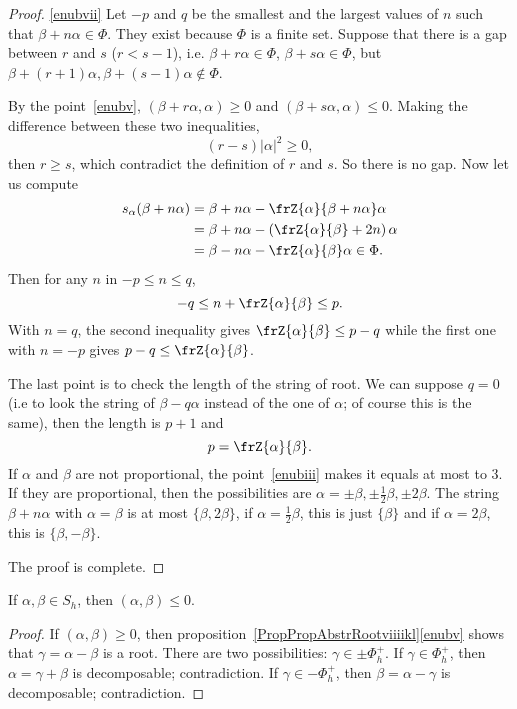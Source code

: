 \begin{proof}
	\ref{enubvii} Let $-p$ and $q$ be the smallest and the largest values of $n$ such that $\beta+n\alpha \in\Phi$. They exist because $\Phi$ is a finite set. Suppose that there is a gap between $r$ and $s$ ($r<s-1$), i.e. $\beta+r\alpha\in\Phi$, $\beta+s\alpha\in\Phi$, but $\beta+(r+1)\alpha,\beta+(s-1)\alpha\notin\Phi$.

	By the point~\ref{enubv}, $(\beta+r\alpha,\alpha)\geq 0$ and $(\beta+s\alpha,\alpha)\leq 0$. Making the difference between these two inequalities,
	\[
		(r-s)|\alpha|^2\geq 0,
	\]
	then $r\geq s$, which contradict the definition of $r$ and $s$. So there is no gap. Now let us compute
	\begin{equation}
		\begin{split}
			s_{\alpha}(\beta+n\alpha)&=\beta+n\alpha-\frZ{\alpha}{\beta+n\alpha}\alpha\\
			&=\beta+n\alpha-\left(    \frZ{\alpha}{\beta}+2n    \right)\alpha\\
			&=\beta-n\alpha-\frZ{\alpha}{\beta}\alpha\in\Phi.
		\end{split}
	\end{equation}
	Then for any $n$ in $-p\leq n\leq q$,
	\[
		-q\leq n+\frZ{\alpha}{\beta}\leq p.
	\]
	With $n=q$, the second inequality gives $\frZ{\alpha}{\beta}\leq p-q$ while the first one with $n=-p$ gives  $p-q\leq\frZ{\alpha}{\beta}$.

	The last point is to check the length of the string of root. We can suppose $q=0$ (i.e to look the string of $\beta-q\alpha$ instead of the one of $\alpha$; of course this is the same), then the length is $p+1$ and
	\[
		p=\frZ{\alpha}{\beta}.
	\]
	If $\alpha$ and $\beta$ are not proportional, the point~\ref{enubiii} makes it equals at most to $3$. If they are proportional, then the possibilities are $\alpha=\pm\beta,\pm\frac{1}{2}\beta,\pm 2\beta$. The string $\beta+n\alpha$ with $\alpha=\beta$ is at most $\{\beta,2\beta\}$, if $\alpha=\frac{1}{2}\beta$, this is just $\{\beta\}$ and if $\alpha=2\beta$, this is $\{\beta,-\beta\}$.

	The proof is complete.
\end{proof}

\begin{lemma}       \label{LemShabShablesz}
	If \( \alpha,\beta\in S_h\), then \( (\alpha,\beta)\leq 0\).
\end{lemma}

\begin{proof}
	If \( (\alpha,\beta)\geq 0\), then proposition~\ref{PropPropAbstrRootviiiikl}\ref{enubv} shows that \( \gamma=\alpha-\beta\) is a root. There are two possibilities: \( \gamma\in\pm\Phi^+_h\). If \( \gamma\in\Phi^+_h\), then \( \alpha=\gamma+\beta\) is decomposable; contradiction. If \( \gamma\in -\Phi^+_h\), then \( \beta=\alpha-\gamma\) is decomposable; contradiction.
\end{proof}

